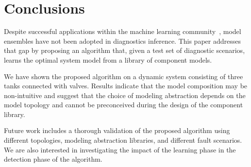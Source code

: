 \section{Conclusions}\label{sec:conclusions}
%
Despite successful applications within the machine learning community~\citep{brown2010ensemble,dietterich2000ensemble},
model ensembles have not been adopted in diagnostics inference. This paper addresses that gap by proposing
an algorithm that, given a test set of diagnostic scenarios, learns the optimal system model from a library of component
models.

We have shown the proposed algorithm on a dynamic system consisting of three tanks connected with valves. Results
indicate that the model composition may be non-intuitive and suggest that the choice of modeling abstraction depends
on the model topology and cannot be preconceived during the design of the component library.

Future work includes a thorough validation of the proposed algorithm using different topologies, modeling abstraction
libraries, and different fault scenarios. We are also interested in investigating the impact of the learning phase
in the detection phase of the algorithm.
